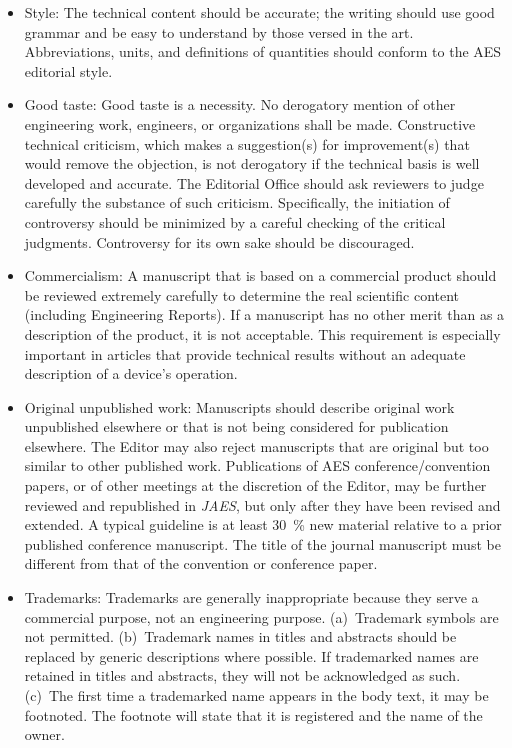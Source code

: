 \documentclass[fleqn,draft]{jaes}
\begin{document}
\begin{itemize}
    \item Style: The technical content should be accurate; the writing should use good grammar and be easy to understand by those versed in the art. Abbreviations, units, and definitions of quantities should conform to the AES editorial style.
    
    \item Good taste: Good taste is a necessity. No derogatory mention of other engineering work, engineers, or organizations shall be made. Constructive technical criticism, which makes a suggestion(s) for improvement(s) that would remove the objection, is not derogatory if the technical basis is well developed and accurate. The Editorial Office should ask reviewers to judge carefully the substance of such criticism. Specifically, the initiation of controversy should be minimized by a careful checking of the critical judgments. Controversy for its own sake should be discouraged.
    
    \item Commercialism: A manuscript that is based on a commercial product should be reviewed extremely carefully to determine the real scientific content (including Engineering Reports). If a manuscript has no other merit than as a description of the product, it is not acceptable. This requirement is especially important in articles that provide technical results without an adequate description of a device’s operation.
    
    \item Original unpublished work: Manuscripts should describe original work unpublished elsewhere or that is not being considered for publication elsewhere. The Editor may also reject manuscripts that are original but too similar to other published work. Publications of AES conference/convention papers, or of other meetings at the discretion of the Editor, may be further reviewed and republished in \emph{JAES}, but only after they have been revised and extended. A typical guideline is at least \SI{30}{\percent} new material relative to a prior published conference manuscript. The title of the journal manuscript must be different from that of the convention or conference paper. 
    
    \item Trademarks: Trademarks are generally inappropriate because they serve a commercial purpose, not an engineering purpose. (a)~Trademark symbols are not permitted. (b)~Trademark names in titles and abstracts should be replaced by generic descriptions where possible. If trademarked names are retained in titles and abstracts, they will not be acknowledged as such. (c)~The first time a trademarked name appears in the body text, it may be footnoted. The footnote will state that it is registered and the name of the owner.
\end{itemize}
\end{document}
